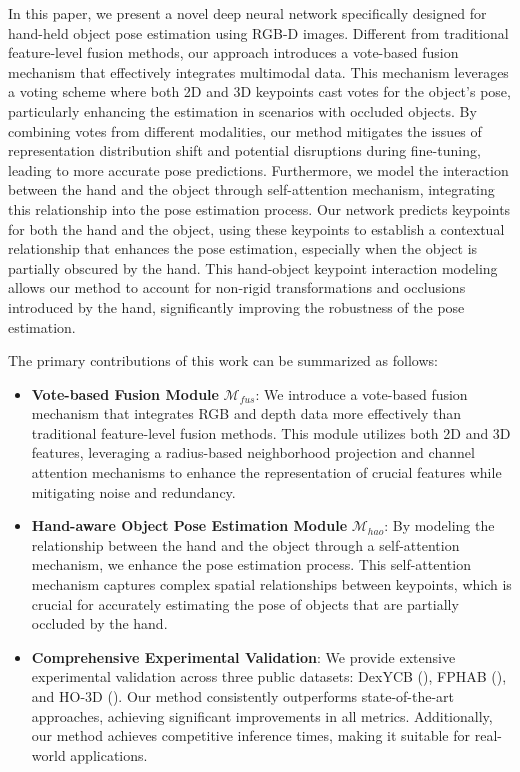 In this paper, we present a novel deep neural network specifically designed for hand-held object pose estimation using RGB-D images. Different from traditional feature-level fusion methods, our approach introduces a vote-based fusion mechanism that effectively integrates multimodal data. This mechanism leverages a voting scheme where both 2D and 3D keypoints cast votes for the object's pose, particularly enhancing the estimation in scenarios with occluded objects. By combining votes from different modalities, our method mitigates the issues of representation distribution shift and potential disruptions during fine-tuning, leading to more accurate pose predictions. Furthermore, we model the interaction between the hand and the object through self-attention mechanism, integrating this relationship into the pose estimation process. Our network predicts keypoints for both the hand and the object, using these keypoints to establish a contextual relationship that enhances the pose estimation, especially when the object is partially obscured by the hand. This hand-object keypoint interaction modeling allows our method to account for non-rigid transformations and occlusions introduced by the hand, significantly improving the robustness of the pose estimation.

The primary contributions of this work can be summarized as follows:

\begin{itemize}

\item \textbf{Vote-based Fusion Module} $\mathcal{M}_{fus}$: We introduce a vote-based fusion mechanism that integrates RGB and depth data more effectively than traditional feature-level fusion methods. This module utilizes both 2D and 3D features, leveraging a radius-based neighborhood projection and channel attention mechanisms to enhance the representation of crucial features while mitigating noise and redundancy. \\

\item \textbf{Hand-aware Object Pose Estimation Module} $\mathcal{M}_{hao}$: By modeling the relationship between the hand and the object through a self-attention mechanism, we enhance the pose estimation process. This self-attention mechanism captures complex spatial relationships between keypoints, which is crucial for accurately estimating the pose of objects that are partially occluded by the hand.

\item \textbf{Comprehensive Experimental Validation}: We provide extensive experimental validation across three public datasets: DexYCB (\cite{chao2021dexycb}), FPHAB (\cite{garcia2018first}), and HO-3D (\cite{hampali2020honnotate}). Our method consistently outperforms state-of-the-art approaches, achieving significant improvements in all metrics. Additionally, our method achieves competitive inference times, making it suitable for real-world applications. \\

\end{itemize}